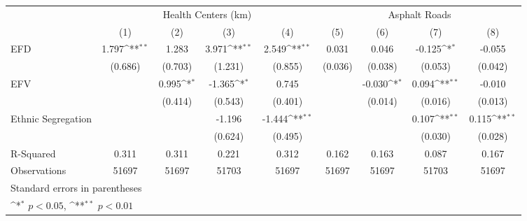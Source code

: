 {
\def\sym#1{\ifmmode^{#1}\else\(^{#1}\)\fi}
\begin{tabular}{l*{8}{c}}
\toprule
                    &\multicolumn{4}{c}{Health Centers (km)}                                            &\multicolumn{4}{c}{Asphalt Roads}                                                  \\\cmidrule(lr){2-5}\cmidrule(lr){6-9}
                    &\multicolumn{1}{c}{(1)}        &\multicolumn{1}{c}{(2)}        &\multicolumn{1}{c}{(3)}        &\multicolumn{1}{c}{(4)}        &\multicolumn{1}{c}{(5)}        &\multicolumn{1}{c}{(6)}        &\multicolumn{1}{c}{(7)}        &\multicolumn{1}{c}{(8)}        \\
\midrule
EFD                 &       1.797\sym{**}&       1.283        &       3.971\sym{**}&       2.549\sym{**}&       0.031        &       0.046        &      -0.125\sym{*} &      -0.055        \\
                    &     (0.686)        &     (0.703)        &     (1.231)        &     (0.855)        &     (0.036)        &     (0.038)        &     (0.053)        &     (0.042)        \\
EFV                 &                    &       0.995\sym{*} &      -1.365\sym{*} &       0.745        &                    &      -0.030\sym{*} &       0.094\sym{**}&      -0.010        \\
                    &                    &     (0.414)        &     (0.543)        &     (0.401)        &                    &     (0.014)        &     (0.016)        &     (0.013)        \\
Ethnic Segregation  &                    &                    &      -1.196        &      -1.444\sym{**}&                    &                    &       0.107\sym{**}&       0.115\sym{**}\\
                    &                    &                    &     (0.624)        &     (0.495)        &                    &                    &     (0.030)        &     (0.028)        \\
\midrule
R-Squared           &\multicolumn{1}{c}{0.311}        &\multicolumn{1}{c}{0.311}        &\multicolumn{1}{c}{0.221}        &\multicolumn{1}{c}{0.312}        &\multicolumn{1}{c}{0.162}        &\multicolumn{1}{c}{0.163}        &\multicolumn{1}{c}{0.087}        &\multicolumn{1}{c}{0.167}        \\
Observations        &\multicolumn{1}{c}{51697}        &\multicolumn{1}{c}{51697}        &\multicolumn{1}{c}{51703}        &\multicolumn{1}{c}{51697}        &\multicolumn{1}{c}{51697}        &\multicolumn{1}{c}{51697}        &\multicolumn{1}{c}{51703}        &\multicolumn{1}{c}{51697}        \\
\bottomrule
\multicolumn{9}{l}{\footnotesize Standard errors in parentheses}\\
\multicolumn{9}{l}{\footnotesize \sym{*} \(p<0.05\), \sym{**} \(p<0.01\)}\\
\end{tabular}
}
